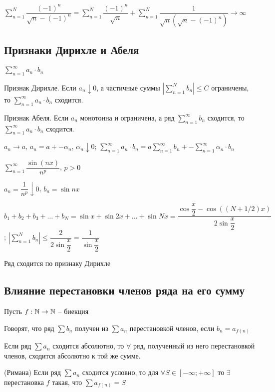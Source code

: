 $\sum_{n=1}^N \dfrac{(-1)^n}{\sqrt{n} - (-1)^n} = \sum_{n=1}^N \dfrac{(-1)^n}{\sqrt{n}} +\sum_{n=1}^N \dfrac{1}{\sqrt{n}(\sqrt{n} - (-1)^n)} \to \infty$

\subsection{Признаки Дирихле и Абеля}

$\sum_{n=1}^{\infty}a_n \cdot b_n$

\begin{theorem}
    Признак Дирихле. Если $a_n \downarrow 0$, а частичные суммы $\left| \sum_{n=1}^N b_n \right| \leq C$ ограничены,
    то $\sum_{n=1}^{\infty}a_n \cdot b_n$ сходится.
\end{theorem}

\begin{theorem}
    Признак Абеля. Если $a_n$ монотонна и ограничена, а ряд $\sum_{n=1}^{\infty}b_n$ сходится,
    то $\sum_{n=1}^{\infty}a_n \cdot b_n$ сходится.
\end{theorem}

$a_n \to a$, $a_n = a +- \alpha_n$, $\alpha_n \downarrow 0$; $\sum_{n=1}^{\infty}a_n \cdot b_n = a \sum_{n=1}^{\infty}b_n +- \sum_{n=1}^{\infty}\alpha_n \cdot b_n$

\begin{example}
    $\sum_{n=1}^{\infty} \dfrac{\sin(nx)}{n^p}$, $p > 0$

    $a_n = \dfrac{1}{n^p} \downarrow 0$, $b_n = \sin nx$

    $b_1 + b_2 + b_3 + \dots + b_N = \sin x+ \sin 2x + \dots + \sin Nx = \dfrac{\cos \dfrac{x}{2} - \cos\left((N + 1/2)x\right)}{2 \sin \dfrac{x}{2}}$; $\left|\sum_{n=1}^{N}b_n\right| \leq \dfrac{2}{2\sin{\dfrac{x}{2}}} = \dfrac{1}{\sin{\dfrac{x}{2}}}$

    Ряд сходится по признаку Дирихле
\end{example}

\subsection{Влияние перестановки членов ряда на его сумму}

Пусть $f: \mathbb{N} \to \mathbb{N}$ -- биекция

Говорят, что ряд $\sum b_n$ получен из $\sum a_n$ перестановкой членов, если $b_n = a_{f(n)}$

Если ряд $\sum a_n$ сходится абсолютно, то $\forall$ ряд, полученный из него перестановкой членов, сходится абсолютно к той же сумме.

\begin{theorem}
(Римана) Если ряд $\sum a_n$ сходится условно, то для $\forall S \in [-\infty; +\infty]$ то $\exists$ перестановка $f$ такая, что $\sum a_{f(n)} = S$
\end{theorem}
